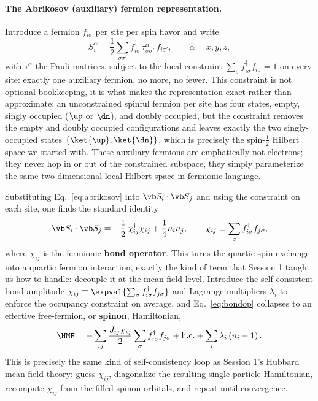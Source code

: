 \documentclass[all_sessions.tex]{subfiles}
\begin{document}
\paragraph{The Abrikosov (auxiliary) fermion representation.} Introduce a fermion $f_{i\sigma}$ per site
per spin flavor and write
\begin{equation}
  S_i^\alpha = \frac12\sum_{\sigma\sigma'} f^\dagger_{i\sigma}\,\tau^\alpha_{\sigma\sigma'}\,f_{i\sigma'},
  \qquad \alpha=x,y,z,
  \label{eq:abrikosov}
\end{equation}
with $\tau^\alpha$ the Pauli matrices, subject to the local constraint $\sum_\sigma
f^\dagger_{i\sigma}f_{i\sigma}=1$ on every site: exactly one auxiliary fermion, no more, no fewer. This
constraint is not optional bookkeeping, it is what makes the representation exact rather than
approximate: an unconstrained spinful fermion per site has four states, empty, singly occupied
($\up$ or $\dn$), and doubly occupied, but the constraint removes the empty and doubly occupied
configurations and leaves exactly the two singly-occupied states $\{\ket{\up},\ket{\dn}\}$, which is
precisely the spin-$\tfrac12$ Hilbert space we started with. These auxiliary fermions are emphatically
not electrons; they never hop in or out of the constrained subspace, they simply parameterize the same
two-dimensional local Hilbert space in fermionic language.

Substituting Eq.~\eqref{eq:abrikosov} into $\vb S_i\cdot\vb S_j$ and using the constraint on each site,
one finds the standard identity
\begin{equation}
  \vb S_i\cdot\vb S_j = -\frac12\, \chi_{ij}^\dagger\chi_{ij} + \frac14 n_i n_j, \qquad
  \chi_{ij} \equiv \sum_\sigma f^\dagger_{i\sigma}f_{j\sigma},
  \label{eq:bondop}
\end{equation}
where $\chi_{ij}$ is the fermionic \textbf{bond operator}. This turns the quartic spin exchange into a
quartic fermion interaction, exactly the kind of term that Session 1 taught us how to handle: decouple
it at the mean-field level. Introduce the self-consistent bond amplitude
$\chi_{ij}\equiv\expval{\sum_\sigma f^\dagger_{i\sigma}f_{j\sigma}}$ and Lagrange multipliers $\lambda_i$
to enforce the occupancy constraint on average, and Eq.~\eqref{eq:bondop} collapses to an effective
free-fermion, or \textbf{spinon}, Hamiltonian,
\begin{equation}
  \HMF = -\sum_{ij}\frac{J_{ij}\chi_{ij}}{2}\sum_\sigma f^\dagger_{i\sigma}f_{j\sigma} + \mathrm{h.c.}
    + \sum_i \lambda_i\left(n_i - 1\right).
  \label{eq:mfspinon}
\end{equation}
This is precisely the same kind of self-consistency loop as Session 1's Hubbard mean-field theory: guess
$\chi_{ij}$, diagonalize the resulting single-particle Hamiltonian, recompute $\chi_{ij}$ from the filled
spinon orbitals, and repeat until convergence.
\end{document}
